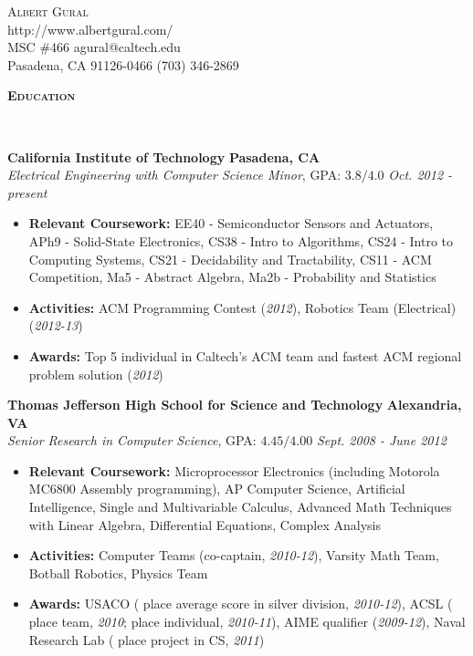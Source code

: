 \documentclass{article}
\newenvironment{changemargin}[2]{%
  \begin{list}{}{%
    \setlength{\topsep}{0pt}%
    \setlength{\leftmargin}{#1}%
    \setlength{\rightmargin}{#2}%
    \setlength{\listparindent}{\parindent}%
    \setlength{\itemindent}{\parindent}%
    \setlength{\parsep}{\parskip}%
  }%
  \item[]}{\end{list}
}
\newcommand{\lineover}{
	\begin{changemargin}{-0.05in}{-0.05in}
		\vspace*{-8pt}
		\hrulefill \\
		\vspace*{-2pt}
	\end{changemargin}
}
\newcommand{\header}[1]{
	\begin{changemargin}{-0.5in}{-0.5in}
		{\large \textbf{\scshape{#1}}}\\
  	\lineover
	\end{changemargin}
}
\newcommand{\contact}[6]{
	\begin{changemargin}{1in}{1in}
		\begin{center}
			{\LARGE \scshape {#1}}\\ \smallskip
			{#4}\\ \smallskip
			{#2} \hfill {#5}\\ \smallskip
			{#3} \hfill {#6}\\ \smallskip 
		\end{center}
	\end{changemargin}
}
\newenvironment{body} {
	\vspace*{-16pt}
	\begin{changemargin}{-0.25in}{-0.5in}
  }	
	{\end{changemargin}
}
\begin{document}
\contact{Albert Gural}{MSC \#466}{Pasadena, CA 91126-0466}{http://www.albertgural.com/}{agural@caltech.edu}{(703) 346-2869}


\header{Education}

\begin{body}
	\vspace{14pt}
	\textbf{California Institute of Technology} \hfill \textbf{Pasadena, CA}{} \\
	\emph{Electrical Engineering with Computer Science Minor}, GPA: $3.8/4.0$ \hfill \emph{Oct. 2012 - present} \\
	\begin{itemize}%
	\item \textbf{Relevant Coursework:} EE40 - Semiconductor Sensors and Actuators, APh9 - Solid-State Electronics, CS38 - Intro to Algorithms, CS24 - Intro to Computing Systems, CS21 - Decidability and Tractability, CS11 - ACM Competition, Ma5 - Abstract Algebra, Ma2b - Probability and Statistics
	\item \textbf{Activities:} ACM Programming Contest (\textit{2012}), Robotics Team (Electrical) (\textit{2012-13})
	\item \textbf{Awards:} Top 5 individual in Caltech's ACM team and fastest ACM regional problem solution (\textit{2012})
	\end{itemize}

	\medskip

	\textbf{Thomas Jefferson High School for Science and Technology} \hfill \textbf{Alexandria, VA} \\
	\emph{Senior Research in Computer Science}, GPA: $4.45/4.00$ \hfill \emph{Sept. 2008 - June 2012} \\
	\begin{itemize}%
	\item \textbf{Relevant Coursework:} Microprocessor Electronics (including Motorola MC6800 Assembly programming), AP Computer Science, Artificial Intelligence, Single and Multivariable Calculus, Advanced Math Techniques with Linear Algebra, Differential Equations, Complex Analysis
	\item \textbf{Activities:} Computer Teams (co-captain, \textit{2010-12}), Varsity Math Team, Botball Robotics, Physics Team
	\item \textbf{Awards:} USACO ( place average score in silver division, \textit{2010-12}), ACSL ( place team, \textit{2010};  place individual, \textit{2010-11}), AIME qualifier (\textit{2009-12}), Naval Research Lab ( place project in CS, \textit{2011})
	\end{itemize}
\end{body}
\end{document}

